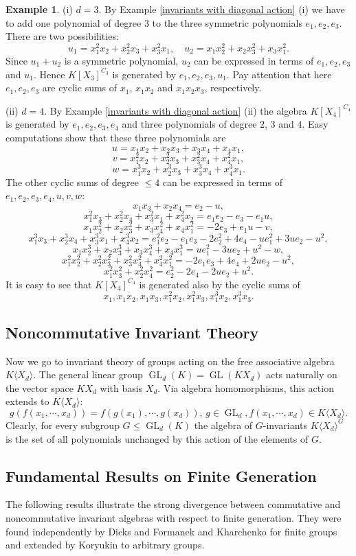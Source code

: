 \documentclass{amsart}
\theoremstyle{definition}
\newtheorem{example}[theorem]{Example}
\DeclareMathOperator{\GL}{GL}
\newcommand{\KXd}{K\langle X_d\rangle}
\begin{document}
\begin{example}\label{three and four commuting variables}
(i) $d=3$. By Example \ref{invariants with diagonal action} (i) we have to add one polynomial of degree $3$ to the three symmetric polynomials $e_1,e_2,e_3$.
There are two possibilities:
\[
u_1=x_1^2x_2+x_2^2x_3+x_3^2x_1,\quad u_2=x_1x_2^2+x_2x_3^2+x_3x_1^2.
\]
Since $u_1+u_2$ is a symmetric polynomial, $u_2$ can be expressed in terms of $e_1,e_2,e_3$ and $u_1$. Hence
$K[X_3]^{C_3}$ is generated by $e_1,e_2,e_3,u_1$. Pay attention that here $e_1, e_2, e_3$ are cyclic sums of $x_1$, $x_1x_2$ and $x_1x_2x_3$, respectively.

(ii) $d=4$. By Example \ref{invariants with diagonal action} (ii) the algebra $K[X_4]^{C_4}$ is generated by
$e_1,e_2,e_3,e_4$ and three polynomials of degree $2$, $3$ and $4$. Easy computations show that these three polynomials are
\[
u=x_1x_2+x_2x_3+x_3x_4+x_4x_1,
\]
\[
v=x_1^2x_2+x_2^2x_3+x_3^2x_4+x_4^2x_1,
\]
\[
w=x_1^3x_2+x_2^3x_3+x_3^3x_4+x_4^3x_1.
\]
The other cyclic sums of degree $\leq 4$ can be expressed in terms of $e_1,e_2,e_3,e_4,u,v,w$:
\[
x_1x_3+x_2x_4=e_2-u,
\]
\[
x_1^2x_3+x_2^2x_4+x_3^2x_1+x_4^2x_2=e_1e_2-e_3-e_1u,
\]
\[
x_1x_2^2+x_2x_3^2+x_3x_4^2+x_4x_1^2=-2e_3+e_1u-v,
\]
\[
x_1^3x_3+x_2^3x_4+x_3^3x_1+x_4^3x_2=e_1^2e_2-e_1e_3-2e_2^2+4e_4-ue_1^2+3ue_2-u^2,
\]
\[
x_1x_2^3+x_2x_3^3+x_3x_4^3+x_4x_1^3=ue_1^2-3ue_2+u^2-w,
\]
\[
x_1^2x_2^2+x_2^2x_3^2+x_3^2x_4^2+x_4^2x_1^2=-2e_1e_3+4e_4+2ue_2-u^2,
\]
\[
x_1^2x_3^2+x_2^2x_4^2=e_2^2-2e_4-2ue_2+u^2.
\]
It is easy to see that $K[X_4]^{C_4}$ is generated also by the cyclic sums of
\[
x_1,x_1x_2,x_1x_3,x_1^2x_2,x_1^2x_3,x_1^3x_2,x_1^3x_3.
\]
\end{example}

\subsection{Noncommutative Invariant Theory}
Now we go to invariant theory of groups acting on the free associative algebra $K\langle X_d\rangle$.
The general linear group $\GL_d(K) = \GL(KX_d)$ acts naturally on the vector space $KX_d$ with basis $X_d$. Via algebra homomorphisms, this action extends to $\KXd$:
\[
g(f(x_1,\cdots, x_d )) = f(g(x_1),\cdots, g(x_d)),\, g \in \GL_d , f(x_1,\cdots, x_d ) \in \KXd.	
\]
Clearly, for every subgroup $G \leq \GL_d(K)$ the algebra of $G$-invariants $\KXd^G$ is the set of all polynomials unchanged by this action of the elements of $G$.

\subsection{Fundamental Results on Finite Generation}
The following results illustrate the strong divergence between commutative and noncommutative invariant algebras with respect to finite generation.
They were found independently by Dicks and Formanek \cite{DiFo} and Kharchenko \cite{Kh2} for finite groups and extended by Koryukin \cite{Kor} to arbitrary groups.
\end{document}
